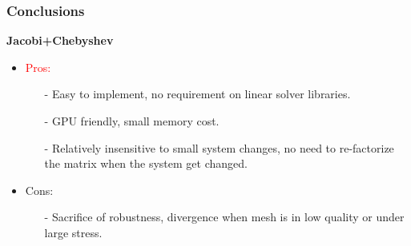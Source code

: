 \documentclass[serif,mathserif]{beamer}
\newcommand{\TODO}[1]{\textcolor{red}{#1}}
\begin{document}
\begin{frame}
 \frametitle{Conclusions}
 \textbf{Jacobi+Chebyshev}
 \begin{itemize}
  \item \TODO{Pros:}
  \begin{itemize}
   \item[-] Easy to implement, no requirement on linear solver libraries.
   \item[-] GPU friendly, small memory cost.
   \item[-] Relatively insensitive to small system changes, no need to re-factorize the matrix 
   when the system get changed.
  \end{itemize}
  \item \textcolor{green!50!black}{Cons:}
  \begin{itemize}
   \item[-] Sacrifice of robustness, divergence when mesh is in low quality or under large stress.
  \end{itemize}
 \end{itemize}
\end{frame}

\begin{frame} 
\end{frame}
\end{document}
